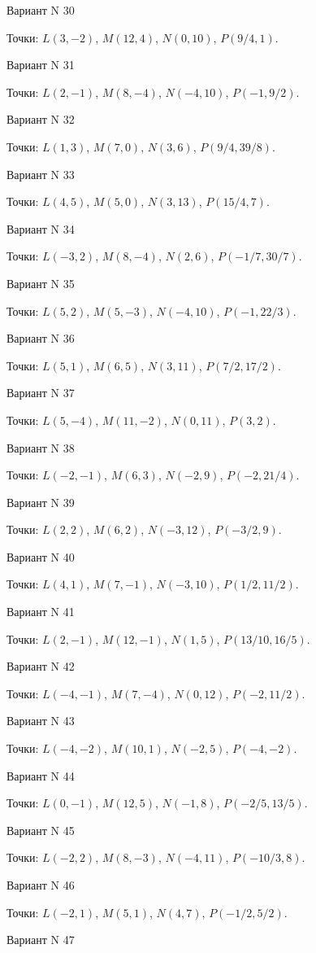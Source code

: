 \documentclass[11pt]{report}
\begin{document}
Вариант N 30

Точки: $L(3, -2)$, $M(12, 4)$, $N(0, 10)$, $P(9/4, 1)$.

Вариант N 31

Точки: $L(2, -1)$, $M(8, -4)$, $N(-4, 10)$, $P(-1, 9/2)$.

Вариант N 32

Точки: $L(1, 3)$, $M(7, 0)$, $N(3, 6)$, $P(9/4, 39/8)$.

Вариант N 33

Точки: $L(4, 5)$, $M(5, 0)$, $N(3, 13)$, $P(15/4, 7)$.

Вариант N 34

Точки: $L(-3, 2)$, $M(8, -4)$, $N(2, 6)$, $P(-1/7, 30/7)$.

Вариант N 35

Точки: $L(5, 2)$, $M(5, -3)$, $N(-4, 10)$, $P(-1, 22/3)$.

Вариант N 36

Точки: $L(5, 1)$, $M(6, 5)$, $N(3, 11)$, $P(7/2, 17/2)$.

Вариант N 37

Точки: $L(5, -4)$, $M(11, -2)$, $N(0, 11)$, $P(3, 2)$.

Вариант N 38

Точки: $L(-2, -1)$, $M(6, 3)$, $N(-2, 9)$, $P(-2, 21/4)$.

Вариант N 39

Точки: $L(2, 2)$, $M(6, 2)$, $N(-3, 12)$, $P(-3/2, 9)$.

Вариант N 40

Точки: $L(4, 1)$, $M(7, -1)$, $N(-3, 10)$, $P(1/2, 11/2)$.

Вариант N 41

Точки: $L(2, -1)$, $M(12, -1)$, $N(1, 5)$, $P(13/10, 16/5)$.

Вариант N 42

Точки: $L(-4, -1)$, $M(7, -4)$, $N(0, 12)$, $P(-2, 11/2)$.

Вариант N 43

Точки: $L(-4, -2)$, $M(10, 1)$, $N(-2, 5)$, $P(-4, -2)$.

Вариант N 44

Точки: $L(0, -1)$, $M(12, 5)$, $N(-1, 8)$, $P(-2/5, 13/5)$.

Вариант N 45

Точки: $L(-2, 2)$, $M(8, -3)$, $N(-4, 11)$, $P(-10/3, 8)$.

Вариант N 46

Точки: $L(-2, 1)$, $M(5, 1)$, $N(4, 7)$, $P(-1/2, 5/2)$.

Вариант N 47
\end{document}
